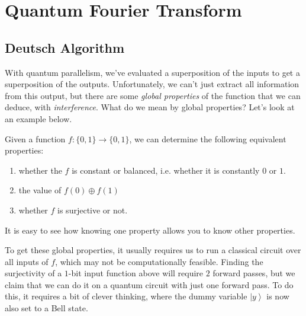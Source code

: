 \documentclass{article}
\newcommand{\ket}[1]{\ensuremath{\left|#1\right\rangle}}
\begin{document}
\section{Quantum Fourier Transform} 

  \subsection{Deutsch Algorithm}

    With quantum parallelism, we've evaluated a superposition of the inputs to get a superposition of the outputs. Unfortunately, we can't just extract all information from this output, but there are some \textit{global properties} of the function that we can deduce, with \textit{interference}. What do we mean by global properties? Let's look at an example below. 

    \begin{example}
      Given a function $f: \{0, 1\} \longrightarrow \{0, 1\}$, we can determine the following equivalent properties: 
      \begin{enumerate} 
        \item whether the $f$ is constant or balanced, i.e. whether it is constantly $0$ or $1$.
        \item the value of $f(0) \oplus f(1)$
        \item whether $f$ is surjective or not. 
      \end{enumerate}
      It is easy to see how knowing one property allows you to know other properties. 
    \end{example}

    To get these global properties, it usually requires us to run a classical circuit over all inputs of $f$, which may not be computationally feasible. Finding the surjectivity of a $1$-bit input function above will require $2$ forward passes, but we claim that we can do it on a quantum circuit with just one forward pass. To do this, it requires a bit of clever thinking, where the dummy variable $\ket{y}$ is now also set to a Bell state. 
\end{document}
